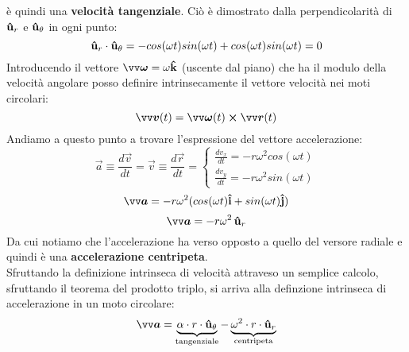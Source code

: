 è quindi una \textbf{velocità tangenziale}. Ciò è dimostrato dalla perpendicolarità di $\mathbf{\hat{u}}_r$ e $\mathbf{\hat{u}}_{\theta}$
in ogni punto:
\[
    \mathbf{\hat{u}}_r \cdot \mathbf{\hat{u}}_{\theta} = -cos(\omega t)sin (\omega t) + cos(\omega t)sin (\omega t) = 0
\]
Introducendo il vettore $\vec{\omega} = \omega \v{k}$ (uscente dal piano) che ha il modulo della velocità
angolare posso definire intrinsecamente il vettore velocità nei moti circolari:
\[
\vec{v}(t) = \vec{\omega}(t) \cross \vec{r}(t)    
\]
Andiamo a questo punto a trovare l'espressione del vettore accelerazione:
\[
\vec{a} \equiv \frac{d \vec{v}}{dt} = 
\vec{v} \equiv \frac{d \vec{r}}{dt} = 
\begin{cases}
    \frac{dv_x}{dt} = -r \omega^2 cos (\omega t) \\
    \frac{dv_y}{dt} = -r \omega^2 sin (\omega t) 
\end{cases}
\]
\[
   \vec{a} = -r \omega^2(cos(\omega t)\v{i} +sin (\omega t)\v{j}) 
\]
\[
   \vec{a} = -r \omega^2 \, \v{u}_r    
\]
Da cui notiamo che l'accelerazione ha verso opposto a quello del versore radiale e quindi è una 
\textbf{accelerazione centripeta}. \\
Sfruttando la definizione intrinseca di velocità attraveso un semplice calcolo, sfruttando il teorema
del prodotto triplo, si arriva alla definzione intrinseca di accelerazione in un moto circolare:
\[
  \vec{a} =\underbrace{\alpha \cdot r \cdot \v{u}_{\theta} }_{\text{tangenziale}}- \underbrace{\omega^2 
  \cdot r \cdot \v{u}_r}_{\text{centripeta}}    
\]
